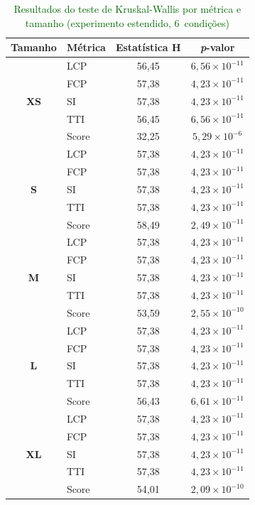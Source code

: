 \begin{table}[!ht]
\centering
\footnotesize
\caption{\textcolor{darkgreen}{Resultados do teste de Kruskal-Wallis por métrica e tamanho (experimento estendido, 6~condições)}}
\label{tab:kruskal-ext}
\begin{tabular}{|c|l|c|c|}
\hline
\textbf{Tamanho} & \textbf{Métrica} & \textbf{Estatística H} & \textbf{\textit{p}-valor} \\
\hline
\multirow{5}{*}{\textbf{XS}}
  & LCP       & 56,45 & $6{,}56{\times}10^{-11}$ \\ \cline{2-4}
  & FCP       & 57,38 & $4{,}23{\times}10^{-11}$ \\ \cline{2-4}
  & SI        & 57,38 & $4{,}23{\times}10^{-11}$ \\ \cline{2-4}
  & TTI       & 56,45 & $6{,}56{\times}10^{-11}$ \\ \cline{2-4}
  & Score     & 32,25 & $5{,}29{\times}10^{-6}$  \\ \hline
\multirow{5}{*}{\textbf{S}}
  & LCP       & 57,38 & $4{,}23{\times}10^{-11}$ \\ \cline{2-4}
  & FCP       & 57,38 & $4{,}23{\times}10^{-11}$ \\ \cline{2-4}
  & SI        & 57,38 & $4{,}23{\times}10^{-11}$ \\ \cline{2-4}
  & TTI       & 57,38 & $4{,}23{\times}10^{-11}$ \\ \cline{2-4}
  & Score     & 58,49 & $2{,}49{\times}10^{-11}$ \\ \hline
\multirow{5}{*}{\textbf{M}}
  & LCP       & 57,38 & $4{,}23{\times}10^{-11}$ \\ \cline{2-4}
  & FCP       & 57,38 & $4{,}23{\times}10^{-11}$ \\ \cline{2-4}
  & SI        & 57,38 & $4{,}23{\times}10^{-11}$ \\ \cline{2-4}
  & TTI       & 57,38 & $4{,}23{\times}10^{-11}$ \\ \cline{2-4}
  & Score     & 53,59 & $2{,}55{\times}10^{-10}$ \\ \hline
\multirow{5}{*}{\textbf{L}}
  & LCP       & 57,38 & $4{,}23{\times}10^{-11}$ \\ \cline{2-4}
  & FCP       & 57,38 & $4{,}23{\times}10^{-11}$ \\ \cline{2-4}
  & SI        & 57,38 & $4{,}23{\times}10^{-11}$ \\ \cline{2-4}
  & TTI       & 57,38 & $4{,}23{\times}10^{-11}$ \\ \cline{2-4}
  & Score     & 56,43 & $6{,}61{\times}10^{-11}$ \\ \hline
\multirow{5}{*}{\textbf{XL}}
  & LCP       & 57,38 & $4{,}23{\times}10^{-11}$ \\ \cline{2-4}
  & FCP       & 57,38 & $4{,}23{\times}10^{-11}$ \\ \cline{2-4}
  & SI        & 57,38 & $4{,}23{\times}10^{-11}$ \\ \cline{2-4}
  & TTI       & 57,38 & $4{,}23{\times}10^{-11}$ \\ \cline{2-4}
  & Score     & 54,01 & $2{,}09{\times}10^{-10}$ \\ \hline
\end{tabular}
\end{table}
